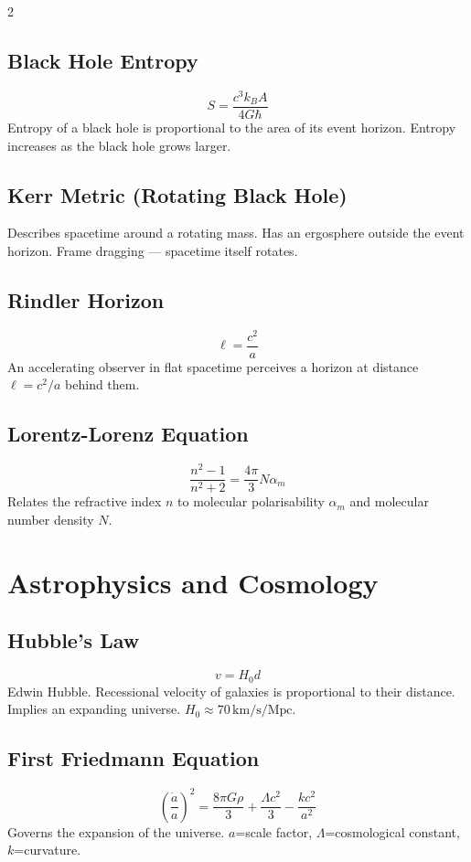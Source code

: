 \documentclass[10pt,a4paper]{article}
\begin{document}
\begin{multicols}{2}
\subsection{Black Hole Entropy}
\[
S = \frac{c^3 k_B A}{4G\hbar}
\]
Entropy of a black hole is proportional to the area of its event horizon. Entropy increases as the black hole grows larger.

\subsection{Kerr Metric (Rotating Black Hole)}
Describes spacetime around a rotating mass. Has an ergosphere outside the event horizon. Frame dragging --- spacetime itself rotates.

\subsection{Rindler Horizon}
\[
\ell = \frac{c^2}{a}
\]
An accelerating observer in flat spacetime perceives a horizon at distance $\ell = c^2/a$ behind them.

\subsection{Lorentz-Lorenz Equation}
\[
\frac{n^2-1}{n^2+2} = \frac{4\pi}{3}N\alpha_m
\]
Relates the refractive index $n$ to molecular polarisability $\alpha_m$ and molecular number density $N$.

\section{Astrophysics and Cosmology}

\subsection{Hubble's Law}
\[
v = H_0 d
\]
Edwin Hubble. Recessional velocity of galaxies is proportional to their distance. Implies an expanding universe. $H_0 \approx 70\,\text{km/s/Mpc}$.

\subsection{First Friedmann Equation}
\[
\left(\frac{\dot{a}}{a}\right)^2 = \frac{8\pi G\rho}{3} + \frac{\Lambda c^2}{3} - \frac{kc^2}{a^2}
\]
Governs the expansion of the universe. $a$=scale factor, $\Lambda$=cosmological constant, $k$=curvature.


\end{multicols}
\end{document}
